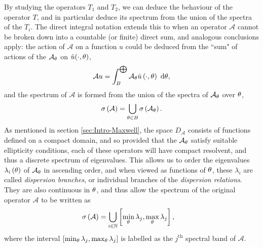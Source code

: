 By studying the operators $T_1$ and $T_2$, we can deduce the behaviour of the operator $T$, and in particular deduce its spectrum from the union of the spectra of the $T_i$.
The direct integral notation extends this to when an operator $\mathcal{A}$ cannot be broken down into a countable (or finite) direct sum, and analogous conclusions apply: the action of $\mathcal{A}$ on a function $u$ could be deduced from the ``sum" of actions of the $\mathcal{A}_{\theta}$ on $\hat{u}(\cdot,\theta)$,
\begin{align} \label{eq:GelfandDirectIntegral}
	\mathcal{A}u = \int_{B}^{\bigoplus}\mathcal{A}_{\theta}\hat{u}\left( \cdot,\theta \right) \ \mathrm{d}\theta,
\end{align}
and the spectrum of $\mathcal{A}$ is formed from the union of the spectra of $\mathcal{A}_{\theta}$ over $\theta$, 
\begin{align*}
	\sigma\left( \mathcal{A} \right) = \bigcup_{\theta\in B}\sigma\left( \mathcal{A}_{\theta} \right).
\end{align*}
As mentioned in section \ref{sec:Intro-Maxwell}, the space $D_{\mathcal{A}}$ consists of functions defined on a compact domain, and so provided that the $\mathcal{A}_{\theta}$ satisfy suitable ellipticity conditions, each of these operators will have compact resolvent, and thus a discrete spectrum of eigenvalues.
This allows us to order the eigenvalues $\lambda_i\left( \theta \right)$ of $\mathcal{A}_{\theta}$ in ascending order, and when viewed as functions of $\theta$, these $\lambda_i$ are called \emph{dispersion branches}, or individual branches of the \emph{dispersion relations}.
They are also continuous in $\theta$, and thus allow the spectrum of the original operator $\mathcal{A}$ to be written as
\begin{align*}
	\sigma\left( \mathcal{A} \right) &= \bigcup_{i\in\mathbb{N}}\left[  \min_{\theta}\lambda_j, \max_{\theta}\lambda_j  \right],
\end{align*}
where the interval $\left[  \min_{\theta}\lambda_j, \max_{\theta}\lambda_j  \right]$ is labelled as the $j^{\text{th}}$ spectral band of $\mathcal{A}$.

